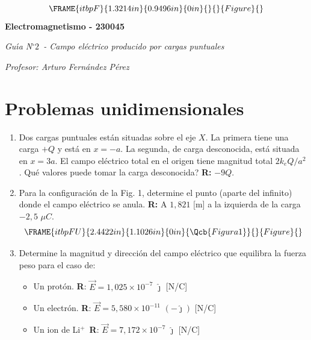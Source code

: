 \documentclass[12pt]{article}
\begin{document}
\begin{center}
\begin{equation*}
\FRAME{itbpF}{1.3214in}{0.9496in}{0in}{}{}{Figure}{\special{language
"Scientific Word";type "GRAPHIC";maintain-aspect-ratio TRUE;display
"USEDEF";valid_file "T";width 1.3214in;height 0.9496in;depth
0in;original-width 1.3552in;original-height 0.9669in;cropleft "0";croptop
"1";cropright "1";cropbottom "0";tempfilename
'QYQBI30B.bmp';tempfile-properties "XPR";}}
\end{equation*}%
\textbf{Electromagnetismo - 230045}

\emph{Gu\'{\i}a N}$%
{{}^\circ}%
2$\emph{\ - Campo el\'{e}ctrico producido por cargas puntuales}

\textit{Profesor: Arturo Fern\'{a}ndez P\'{e}rez}
\end{center}

\section{Problemas unidimensionales}

\begin{enumerate}
\item Dos cargas puntuales est\'{a}n situadas sobre el eje $X$. La primera
tiene una carga $+Q$ y est\'{a} en $x=-a$. La segunda, de carga desconocida,
est\'{a} situada en $x=3a$. El campo el\'{e}ctrico total en el origen tiene
magnitud total $2k_{e}Q/a^{2}$. \textquestiondown Qu\'{e} valores puede
tomar la carga desconocida? \textbf{R:} $-9Q.$

\item Para la configuraci\'{o}n de la Fig. 1, determine el punto (aparte del
infinito) donde el campo el\'{e}ctrico se anula. \textbf{R:} A $1,821$ [m] a
la izquierda de la carga $-2,5$ $\mu C.$%
\begin{equation*}
\FRAME{itbpFU}{2.4422in}{1.1026in}{0in}{\Qcb{Figura 1}}{}{Figure}{\special%
{language "Scientific Word";type "GRAPHIC";maintain-aspect-ratio
TRUE;display "USEDEF";valid_file "T";width 2.4422in;height 1.1026in;depth
0in;original-width 4.7911in;original-height 2.1473in;cropleft "0";croptop
"1";cropright "1";cropbottom "0";tempfilename
'QYQBI40C.wmf';tempfile-properties "XPR";}}
\end{equation*}

\item Determine la magnitud y direcci\'{o}n del campo el\'{e}ctrico que
equilibra la fuerza peso para el caso de:

\begin{itemize}
\item Un prot\'{o}n. \textbf{R}: $\vec{E}=1,025\times 10^{-7}$ $\hat{\jmath}$
[N/C]

\item Un electr\'{o}n. \textbf{R}: $\vec{E}=5,580\times 10^{-11}$ $\left( -%
\hat{\jmath}\right) $ [N/C]

\item Un ion de Li$^{+}$\pagebreak\ \textbf{R}: $\vec{E}=7,172\times 10^{-7}$
$\hat{\jmath}$ [N/C]
\end{itemize}
\end{enumerate}
\end{document}
